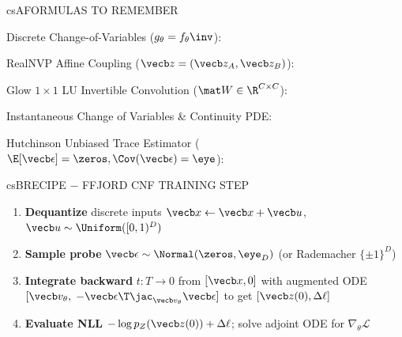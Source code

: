 \documentclass[../../../../master.tex]{subfiles}
\begin{document}
\begin{cscolumns}
\begin{cscard}{csA}{FORMULAS TO REMEMBER}
  \begin{csbul}
    \item Discrete Change-of-Variables ($g_\theta=f_\theta\inv$):
    \item RealNVP Affine Coupling ($\vecb z=(\vecb z_A,\vecb z_B)$):
    \item Glow $1\times 1$ LU Invertible Convolution ($\mat W\in\R^{C\times C}$):
    \item Instantaneous Change of Variables \& Continuity PDE:
    \item Hutchinson Unbiased Trace Estimator ($\E[\vecb\epsilon]=\zeros,\Cov(\vecb\epsilon)=\eye$):
  \end{csbul}
\end{cscard}

\begin{cscard}{csB}{RECIPE $-$ FFJORD CNF TRAINING STEP}
  \begin{enumerate}[leftmargin=1.2em, itemsep=1pt, topsep=1pt, parsep=0pt]
    \item \textbf{Dequantize} discrete inputs $\vecb x\leftarrow\vecb x+\vecb u$, $\vecb u\sim\Uniform([0,1)^D)$
    \item \textbf{Sample probe} $\vecb\epsilon\sim\Normal(\zeros,\eye_D)$ (or Rademacher $\{\pm 1\}^D$)
    \item \textbf{Integrate backward} $t:T\to 0$ from $[\vecb x,0]$ with augmented ODE $[\vecb v_\theta,\;-\vecb\epsilon\T\jac_{\vecb v_\theta}\vecb\epsilon]$ to get $[\vecb z(0),\Delta\ell]$
    \item \textbf{Evaluate NLL} $-\log p_Z(\vecb z(0))+\Delta\ell$; solve adjoint ODE for $\nabla_\theta\mathcal L$
  \end{enumerate}
\end{cscard}
\columnbreak


\end{cscolumns}
\end{document}
